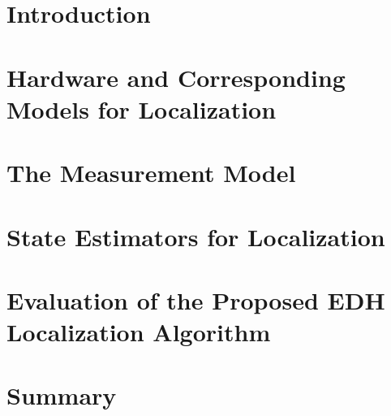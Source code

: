 \documentclass[a4paper, 12pt]{paper}
\begin{document}
\section{Introduction}

\pagebreak
\section{Hardware and Corresponding Models for Localization}

\pagebreak
\section{The Measurement Model}

\pagebreak
\section{State Estimators for Localization}\label{sec:state-estimators}

\pagebreak
\section{Evaluation of the Proposed EDH Localization Algorithm}

\pagebreak
\section{Summary}

\pagebreak

\end{document}
